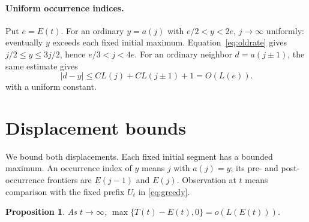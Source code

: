\documentclass[11pt]{article}
\newtheorem{proposition}[theorem]{Proposition}
\theoremstyle{remark}
\newcommand{\U}{U}
\newcommand{\pos}[1]{\max\{#1,0\}}
\begin{document}
\paragraph{Uniform occurrence indices.}
Put $e=E(t)$. For an ordinary $y=a(j)$ with $e/2<y<2e$, $j\to\infty$ uniformly:
eventually $y$ exceeds each fixed initial maximum. Equation~\eqref{eq:oldrate}
gives $j/2\leq y\leq3j/2$, hence $e/3<j<4e$. For an ordinary neighbor
$d=a(j\pm1)$, the same estimate gives
\begin{equation}\label{eq:adjacent}
 |d-y|\leq C L(j)+C L(j\pm1)+1=O(L(e)).
\end{equation}
with a uniform constant.

\section{Displacement bounds}\label{sec:upper}

We bound both displacements. Each fixed initial segment has a bounded maximum.
An occurrence index of $y$ means $j$ with $a(j)=y$; its pre- and
post-occurrence frontiers are $E(j-1)$ and $E(j)$. Observation at $t$
means comparison with the fixed prefix $\U_t$ in \eqref{eq:greedy}.

\begin{proposition}\label{prop:upper}
As $t\to\infty$,
$\pos{T(t)-E(t)}=o(L(E(t)))$.
\end{proposition}
\end{document}
